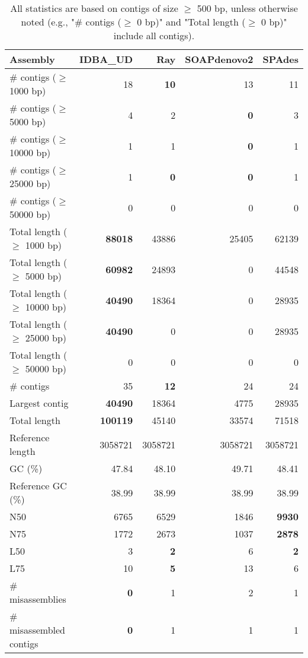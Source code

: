 \documentclass[12pt,a4paper]{article}
\begin{document}
\begin{table}[ht]
\begin{center}
\caption{All statistics are based on contigs of size $\geq$ 500 bp, unless otherwise noted (e.g., "\# contigs ($\geq$ 0 bp)" and "Total length ($\geq$ 0 bp)" include all contigs).}
\begin{tabular}{|l*{4}{|r}|}
\hline
Assembly & IDBA\_UD & Ray & SOAPdenovo2 & SPAdes \\ \hline
\# contigs ($\geq$ 1000 bp) & 18 & {\bf 10} & 13 & 11 \\ \hline
\# contigs ($\geq$ 5000 bp) & 4 & 2 & {\bf 0} & 3 \\ \hline
\# contigs ($\geq$ 10000 bp) & 1 & 1 & {\bf 0} & 1 \\ \hline
\# contigs ($\geq$ 25000 bp) & 1 & {\bf 0} & {\bf 0} & 1 \\ \hline
\# contigs ($\geq$ 50000 bp) & 0 & 0 & 0 & 0 \\ \hline
Total length ($\geq$ 1000 bp) & {\bf 88018} & 43886 & 25405 & 62139 \\ \hline
Total length ($\geq$ 5000 bp) & {\bf 60982} & 24893 & 0 & 44548 \\ \hline
Total length ($\geq$ 10000 bp) & {\bf 40490} & 18364 & 0 & 28935 \\ \hline
Total length ($\geq$ 25000 bp) & {\bf 40490} & 0 & 0 & 28935 \\ \hline
Total length ($\geq$ 50000 bp) & 0 & 0 & 0 & 0 \\ \hline
\# contigs & 35 & {\bf 12} & 24 & 24 \\ \hline
Largest contig & {\bf 40490} & 18364 & 4775 & 28935 \\ \hline
Total length & {\bf 100119} & 45140 & 33574 & 71518 \\ \hline
Reference length & 3058721 & 3058721 & 3058721 & 3058721 \\ \hline
GC (\%) & 47.84 & 48.10 & 49.71 & 48.41 \\ \hline
Reference GC (\%) & 38.99 & 38.99 & 38.99 & 38.99 \\ \hline
N50 & 6765 & 6529 & 1846 & {\bf 9930} \\ \hline
N75 & 1772 & 2673 & 1037 & {\bf 2878} \\ \hline
L50 & 3 & {\bf 2} & 6 & {\bf 2} \\ \hline
L75 & 10 & {\bf 5} & 13 & 6 \\ \hline
\# misassemblies & {\bf 0} & 1 & 2 & 1 \\ \hline
\# misassembled contigs & {\bf 0} & 1 & 1 & 1 \\ \hline

\end{tabular}
\end{center}
\end{table}
\end{document}

